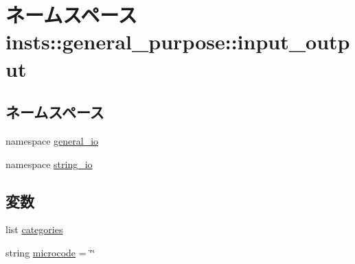 \hypertarget{namespaceinsts_1_1general__purpose_1_1input__output}{
\section{ネームスペース insts::general\_\-purpose::input\_\-output}
\label{namespaceinsts_1_1general__purpose_1_1input__output}
}
\subsection*{ネームスペース}
\begin{DoxyCompactItemize}
\item 
namespace \hyperlink{namespaceinsts_1_1general__purpose_1_1input__output_1_1general__io}{general\_\-io}
\item 
namespace \hyperlink{namespaceinsts_1_1general__purpose_1_1input__output_1_1string__io}{string\_\-io}
\end{DoxyCompactItemize}
\subsection*{変数}
\begin{DoxyCompactItemize}
\item 
list \hyperlink{namespaceinsts_1_1general__purpose_1_1input__output_a273cf0f1630af14c1582f05e53354a55}{categories}
\item 
string \hyperlink{namespaceinsts_1_1general__purpose_1_1input__output_a770f11a173e99389a8802f0107ed8f52}{microcode} = \char`\"{}\char`\"{}
\end{DoxyCompactItemize}


